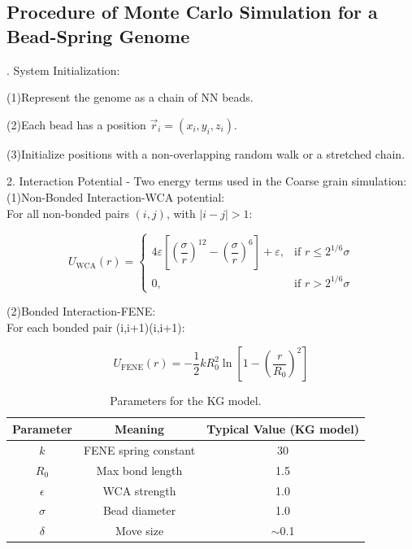 \documentclass[12pt]{article}
\begin{document}
\begin{flushleft}
\subsection*{Procedure of Monte Carlo Simulation for a Bead-Spring Genome}
. System Initialization:

\setlength{\parindent}{6em} (1)Represent the genome as a chain of NN beads.

(2)Each bead has a position $\vec{r}_i = (x_i, y_i, z_i)$.

(3)Initialize positions with a non-overlapping random walk or a stretched chain.\\

\setlength{\parindent}{0pt}




2. Interaction Potential - Two energy terms used in the Coarse grain simulation:\\

\setlength{\parindent}{6em}(1)Non-Bonded Interaction-WCA potential:\\
\setlength{\parindent}{0pt}
\setlength{\parindent}{7em}For all non-bonded pairs $(i, j)$, with $|i - j| > 1$:
\setlength{\parindent}{0pt}

\begin{equation}
U_{\text{WCA}}(r) = 
\begin{cases}
4\varepsilon \left[ \left( \dfrac{\sigma}{r} \right)^{12} - \left( \dfrac{\sigma}{r} \right)^6 \right] + \varepsilon, & \text{if } r \leq 2^{1/6} \sigma \\
0, & \text{if } r > 2^{1/6} \sigma
\end{cases}
\end{equation}


\setlength{\parindent}{6em}(2)Bonded Interaction-FENE:\\
\setlength{\parindent}{0pt}
\setlength{\parindent}{8em}For each bonded pair (i,i+1)(i,i+1):

\begin{equation}
U_{\text{FENE}}(r) = -\frac{1}{2} k R_0^2 \ln \left[ 1 - \left( \frac{r}{R_0} \right)^2 \right]
\end{equation}

\setlength{\parindent}{45pt}

\begin{table}[h]
\centering
\begin{tabular}{|c|c|c|}
\hline
\textbf{Parameter} & \textbf{Meaning} & \textbf{Typical Value (KG model)} \\ \hline
$k$ & FENE spring constant & 30 \\ \hline
$R_0$ & Max bond length & 1.5 \\ \hline
$\epsilon$ & WCA strength & 1.0 \\ \hline
$\sigma$ & Bead diameter & 1.0 \\ \hline
$\delta$ & Move size & $\sim$0.1 \\ \hline
\end{tabular}
\caption{Parameters for the KG model.}
\label{tab:kg_parameters}
\end{table}




\end{flushleft}
\end{document}
